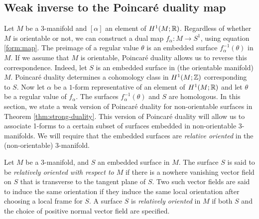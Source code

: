 \subsection{Weak inverse to the Poincar\'e duality map}
\label{sec:weak-inverse-poinc}

Let $M$ be a 3-manifold and $[\alpha]$ an element of $H^1(M;\mathbb{R})$.  Regardless of whether $M$ is orientable or not, we can construct a dual map $f_\alpha:M\rightarrow S^1$, using equation \eqref{form:map}.
The preimage of a regular value $\theta$ is an embedded surface $f_{\alpha}^{-1}(\theta)$ in $M$.
If we assume that $M$ is orientable, Poincar\'e duality allows us to reverse this correspondence.  Indeed, let $S$ is an embedded surface in (the orientable manifold) $M$.  Poincar\'e duality determines a cohomology class in $H^1(M; \mathbb{Z})$ corresponding to $S$.
Now let $\alpha$ be a $1$-form representative of an element of $H^1(M;\mathbb{R})$ and let $\theta$ be a regular value of $f_{\alpha}$.  The surfaces $f_{\alpha}^{-1}(\theta)$ and $S$ are homologous.
In this section, we state a weak version of Poincar\'e duality for non-orientable surfaces in Theorem \ref{thm:strong-duality}.  This version of Poincar\'e duality will allow us to associate 1-forms to a certain subset of surfaces embedded in non-orientable 3-manifolds.
We will require that the embedded surfaces are \emph{relative oriented} in the (non-orientable) 3-manifold.

  Let $M$ be a $3$-manifold, and $S$ an embedded surface in $M$.
  The surface $S$ is said to be \emph{relatively oriented with respect to $M$} if there is a nowhere vanishing vector field on $S$ that is transverse to the tangent plane of $S$.
  Two such vector fields are said to induce the same orientation if they induce the same local orientation after choosing a local frame for $S$.
  A surface $S$ is \emph{relatively oriented} in $M$ if both $S$ and the choice of positive normal vector field are specified.

